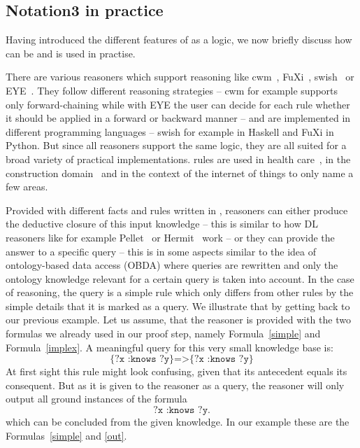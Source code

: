 



\subsection{Notation3 in practice}\label{prn3}
\sloppy
Having introduced the different features of \nthree as a logic, we now briefly discuss how \nthree can be and is used in practise. 
% 

There are various reasoners which support \nthree reasoning like cwm~\cite{cwm}, FuXi~\cite{fuxi}, swish~\cite{swish} or EYE~\cite{eye}. They follow different reasoning strategies
--
cwm for example supports only  forward-chaining while with EYE the user can decide for each rule whether it should be applied in a forward or backward manner -- and are implemented 
in different programming languages -- swish for example in Haskell and FuXi in Python. But since all reasoners support the same logic, they are all suited for 
a broad variety of practical 
implementations. \nthree rules are used in health care~\cite{sun,dou}, in the construction domain~\cite{bau} and in the context of the internet of things \cite{iot} 
to only name a few areas.

Provided with different facts and rules written in \nthree, reasoners can either produce the deductive closure of this input knowledge -- this is similar to how \owl DL reasoners
like for example 
Pellet~\cite{Pellet} or Hermit~\cite{hermit} work -- or they can provide the answer to a specific query -- this is in some aspects similar to the idea of 
ontology-based data access (OBDA) \cite{obda} where queries are rewritten and only the ontology knowledge relevant for a certain query is taken into account. 
In the case of \nthree reasoning, the query is a simple \nthree rule which only differs from other rules by the simple details that it is marked as a query. We illustrate that by getting back to our previous example.
Let us assume, that the reasoner is provided with the two formulas we already used in our proof step, namely Formula~\ref{simple} and Formula~\ref{implex}. A meaningful query for this very small knowledge base is:
\begin{equation}
 \texttt{\{?x :knows ?y\}=>\{?x :knows ?y\}}
\end{equation}
At first sight this rule might look confusing, given that its antecedent equals its consequent. But as it is given to the reasoner as a query, the reasoner will only output all ground instances of the 
formula 
\[
 \texttt{?x :knows ?y.}
\]
which can be concluded from the given knowledge. In our example these are the Formulas~\ref{simple} and \ref{out}. 


